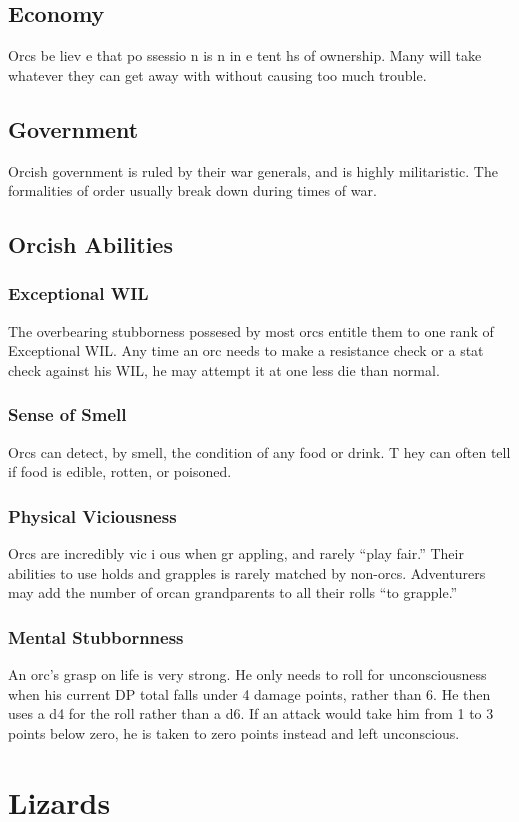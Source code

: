 \begin{multicols*}{2}
\subsection{Economy}
Orcs be liev e that po ssessio n is n in e tent hs of
ownership. Many will take whatever they can get away with
without causing too much trouble.
\subsection{Government}
Orcish government is ruled by their war generals,
and is highly militaristic. The formalities of order usually
break down during times of war.
\subsection{Orcish Abilities}
\subsubsection{Exceptional WIL}
The overbearing stubborness possesed by most orcs
entitle them to one rank of Exceptional WIL. Any time an
orc needs to make a resistance check or a stat check against
his WIL, he may attempt it at one less die than normal.
\subsubsection{Sense of Smell}
Orcs can detect, by smell, the condition of any food
or drink. T hey can often tell if food is edible, rotten, or
poisoned.
\subsubsection{Physical Viciousness}
Orcs are incredibly vic i ous when gr appling, and
rarely “play fair.” Their abilities to use holds and grapples is
rarely matched by non-orcs. Adventurers may add the number
of orcan grandparents to all their rolls “to grapple.”
\subsubsection{Mental Stubbornness}
An orc’s grasp on life is very strong. He only needs
to roll for unconsciousness when his current DP total falls
under 4 damage points, rather than 6. He then uses a d4 for
the roll rather than a d6. If an attack would take him from 1 to
3 points below zero, he is taken to zero points instead and left
unconscious.
\section{Lizards}

\end{multicols*}
